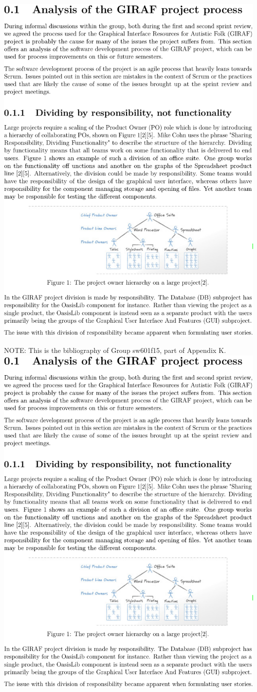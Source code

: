 \noindent\includegraphics[page=6,width=1\textwidth]{part_appendix/sw601f15.pdf}

\clearpage{}\noindent\textsf{NOTE:} This is the bibliography of Group sw601f15, part of Appendix K\@.\\

\noindent\includegraphics[page=7,width=1\textwidth]{part_appendix/sw601f15.pdf}